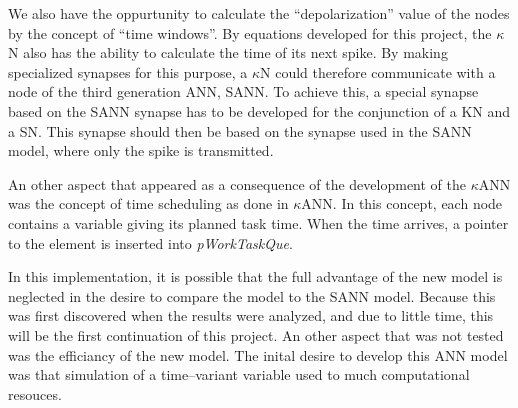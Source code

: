 We also have the oppurtunity to calculate the ``depolarization'' value of the nodes by the concept of ``time windows''. 
By equations developed for this project, the $\kappa$N also has the ability to calculate the time of its next spike.
By making specialized synapses for this purpose, a $\kappa$N could therefore communicate with a node of the third generation ANN, SANN.
To achieve this, a special synapse based on the SANN synapse has to be developed for the conjunction of a KN and a SN.
This synapse should then be based on the synapse used in the SANN model, where only the spike is transmitted.



An other aspect that appeared as a consequence of the development of the $\kappa$ANN was the concept of time scheduling as done in $\kappa$ANN.
In this concept, each node contains a variable giving its planned task time.
When the time arrives, a pointer to the element is inserted into \emph{pWorkTaskQue}.




In this implementation, it is possible that the full advantage of the new model is neglected in the desire to compare the model to the SANN model.
Because this was first discovered when the results were analyzed, and due to little time, this will be the first continuation of this project.			%
An other aspect that was not tested was the efficiancy of the new model.
The inital desire to develop this ANN model was that simulation of a time--variant variable used to much computational resouces.

